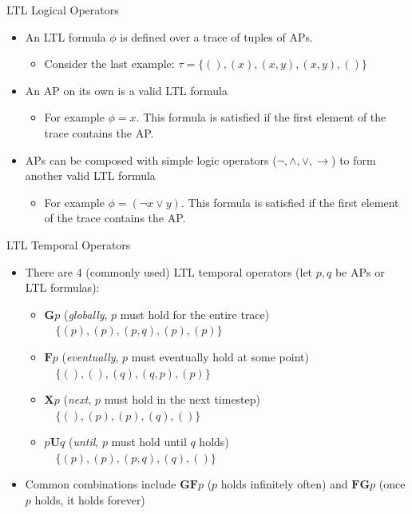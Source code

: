 \documentclass[12pt,aspectratio=169]{beamer}
\begin{document}
\begin{frame}{LTL Logical Operators}
  \begin{itemize}
    \setlength\itemsep{0.75em}
    \item An LTL formula $\phi$ is defined over a trace of tuples of APs.
      \begin{itemize}
        \item {\small Consider the last example: $\tau = \{( ), (x), (x, y), (x, y), ( )\}$}
      \end{itemize}
    \item An AP on its own is a valid LTL formula
      \begin{itemize}
        \item {\small For example $\phi = x$. This formula is satisfied if the first element of the trace contains the AP.}
      \end{itemize}
    \item APs can be composed with simple logic operators ($\lnot, \land, \lor, \rightarrow$) to form another valid LTL formula
      \begin{itemize}
        \item {\small For example $\phi = (\lnot x \lor y)$. This formula is satisfied if the first element of the trace contains the AP.}
      \end{itemize}
  \end{itemize}
\end{frame}

\begin{frame}{LTL Temporal Operators}
  \begin{itemize}
    \item There are 4 (commonly used) LTL temporal operators (let $p, q$ be APs or LTL formulas):
      \begin{itemize}
        \setlength\itemsep{0.5em}
        \item $\mathbf{G} p$ (\textit{globally}, $p$ must hold for the entire trace) \\
          {\small $\quad \{(p), (p), (p,q), (p), (p)\}$}
        \item $\mathbf{F} p$ (\textit{eventually}, $p$ must eventually hold at some point)\\
          {\small $\quad \{(), (), (q), (q,p), (p)\}$}
        \item $\mathbf{X} p$ (\textit{next}, $p$ must hold in the next timestep) \\
          {\small $\quad \{(), (p), (p), (q), ()\}$}
        \item $p \mathbf{U} q$ (\textit{until}, $p$ must hold until $q$ holds) \\
          {\small $\quad \{(p), (p), (p, q), (q), ()\}$}
      \end{itemize}
    \item Common combinations include $\mathbf{G} \mathbf{F} p$ ($p$ holds infinitely often) and $\mathbf{FG} p$ (once $p$ holds, it holds forever)
  \end{itemize}
\end{frame}
\end{document}
